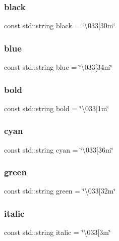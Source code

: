 \subsubsection{black}
{\footnotesize\ttfamily const std\+::string black = \char`\"{}\textbackslash{}033[30m\char`\"{}}

\mbox{\label{_logger_8cpp_a3f312aaa00f31d382a52e52d9505df08}} 
\subsubsection{blue}
{\footnotesize\ttfamily const std\+::string blue = \char`\"{}\textbackslash{}033[34m\char`\"{}}

\mbox{\label{_logger_8cpp_a80cda35843a67360b271e19d75a25d32}} 
\subsubsection{bold}
{\footnotesize\ttfamily const std\+::string bold = \char`\"{}\textbackslash{}033[1m\char`\"{}}

\mbox{\label{_logger_8cpp_a318c6830790132f4763b2f2b6dbaf126}} 
\subsubsection{cyan}
{\footnotesize\ttfamily const std\+::string cyan = \char`\"{}\textbackslash{}033[36m\char`\"{}}

\mbox{\label{_logger_8cpp_a0490a675322d0259b6571db0d96599b8}} 
\subsubsection{green}
{\footnotesize\ttfamily const std\+::string green = \char`\"{}\textbackslash{}033[32m\char`\"{}}

\mbox{\label{_logger_8cpp_af18f9cbf11b35a907dd685be2e87198b}} 
\subsubsection{italic}
{\footnotesize\ttfamily const std\+::string italic = \char`\"{}\textbackslash{}033[3m\char`\"{}}

